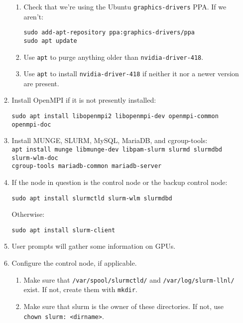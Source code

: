 \begin{enumerate}
\begin{enumerate}
		\begin{enumerate}
		\item Check that we're using the Ubuntu \texttt{graphics-drivers} PPA. If we aren't:

			\texttt{sudo add-apt-repository ppa:graphics-drivers/ppa} \\
			\texttt{sudo apt update}

		\item Use \texttt{apt} to purge anything older than \texttt{nvidia-driver-418}.

		\item Use \texttt{apt} to install \texttt{nvidia-driver-418} if neither it nor a newer version are present.

		\end{enumerate}

	\item Install OpenMPI if it is not presently installed:

		\texttt{sudo apt install libopenmpi2 libopenmpi-dev openmpi-common openmpi-doc}

	\item Install MUNGE, SLURM, MySQL, MariaDB, and cgroup-tools: \\
		\texttt{apt install munge libmunge-dev libpam-slurm slurmd slurmdbd slurm-wlm-doc \\ cgroup-tools mariadb-common mariadb-server} %

	\item If the node in question is the control node or the backup control node:

		\texttt{sudo apt install slurmctld slurm-wlm slurmdbd}

		Otherwise:

		\texttt{sudo apt install slurm-client} 

	\item User prompts will gather some information on GPUs.

	\item Configure the control node, if applicable. 

		\begin{enumerate}
		\item Make sure that \texttt{/var/spool/slurmctld/} and \texttt{/var/log/slurm-llnl/} exist. If not, create them with \texttt{mkdir}.

		\item Make sure that slurm is the owner of these directories. If not, use \texttt{chown slurm: <dirname>}.


\end{enumerate}
\end{enumerate}
\end{enumerate}
